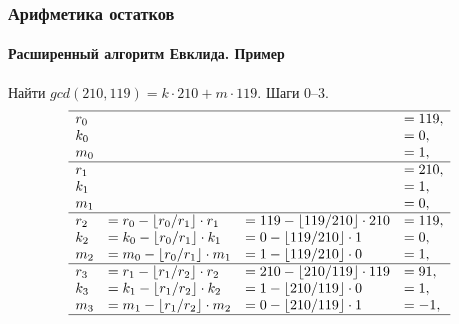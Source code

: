 \begin{frame}
    \frametitle{Арифметика остатков}
    \framesubtitle{Расширенный алгоритм Евклида. Пример}
    
    Найти $gcd(210, 119)=k\cdot 210 + m\cdot 119$. Шаги 0--3.
    \[
        \begin{array}[c]{llll}
        \hline
        r_0&&&=119,\\
        k_0&&&=0,\\
        m_0&&&=1,\\
        \hline
        r_1&&&=210,\\
        k_1&&&=1,\\
        m_1&&&=0,\\
        \hline
        r_2&=r_0 - \lfloor r_0/r_1\rfloor\cdot r_1&=119-\lfloor 119/210\rfloor\cdot 210&=119,\\
        k_2&=k_{0}-\lfloor r_{0}/r_{1}\rfloor\cdot k_{1}&=0-\lfloor 119/210\rfloor\cdot 1&=0,\\
        m_2&=m_{0}-\lfloor r_{0}/r_{1}\rfloor\cdot m_{1}&=1-\lfloor 119/210\rfloor\cdot 0&=1,\\
        \hline
        r_3&=r_{1} - \lfloor r_{1}/r_{2}\rfloor\cdot r_{2}&=210-\lfloor 210/119\rfloor\cdot 119&=91,\\
        k_3&=k_{1}-\lfloor r_{1}/r_{2}\rfloor\cdot k_{2}&=1-\lfloor 210/119\rfloor\cdot 0&=1,\\
        m_3&=m_{1}-\lfloor r_{1}/r_{2}\rfloor\cdot m_{2}&=0-\lfloor 210/119\rfloor\cdot 1&=-1,\\
        \hline
        \end{array}
    \]
\end{frame}


